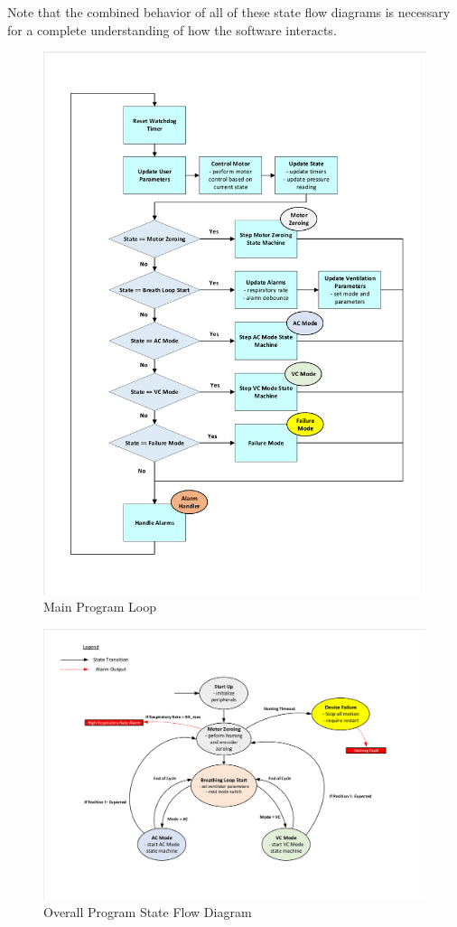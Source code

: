 \documentclass[]{article}
\begin{document}
Note that the combined behavior of all of these state flow diagrams is necessary for a complete understanding of how the software interacts.

\begin{figure}
	\includegraphics[scale= 0.82, trim=15 60 15 60, clip]{figures/main_loop.pdf}
	\caption{Main Program Loop}
	\label{fig:main_loop}
\end{figure}

\begin{figure}
	\includegraphics[scale=0.8, trim = 6 6 6 6, clip]{figures/main_state_flow.pdf}
	\caption{Overall Program State Flow Diagram}
	\label{fig:main_stfd}
\end{figure}
\end{document}

